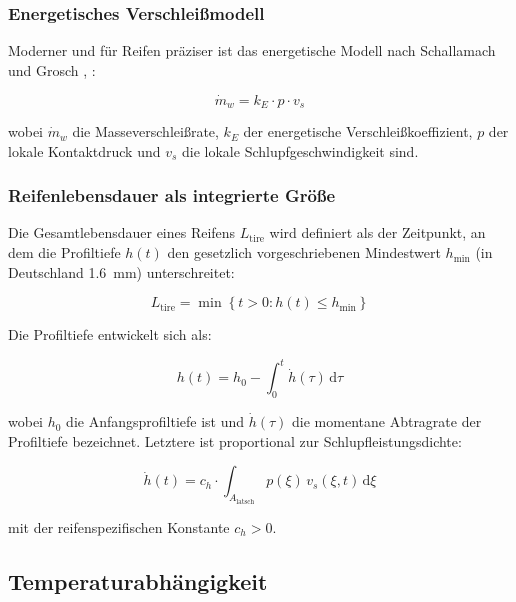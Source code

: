 ﻿\documentclass[12pt,a4paper]{article}
\theoremstyle{definition}
\theoremstyle{remark}
\newcommand{\Ltire}{L_{\mathrm{tire}}}
\begin{document}
\subsubsection{Energetisches Verschleißmodell}

Moderner und für Reifen präziser ist das energetische Modell nach
Schallamach und Grosch \cite{Schallamach1971}, \cite{Grosch1963}:

\begin{equation}
  \dot{m}_w = k_E \cdot p \cdot v_s
  \label{eq:energetisch}
\end{equation}

wobei $\dot{m}_w$ die Masseverschleißrate, $k_E$ der energetische
Verschleißkoeffizient, $p$ der lokale Kontaktdruck und $v_s$ die lokale
Schlupfgeschwindigkeit sind.

\subsubsection{Reifenlebensdauer als integrierte Größe}

Die Gesamtlebensdauer eines Reifens $\Ltire$ wird definiert als der
Zeitpunkt, an dem die Profiltiefe $h(t)$ den gesetzlich vorgeschriebenen
Mindest\-wert $h_{\min}$ (in Deutschland \SI{1,6}{\milli\metre}) unterschreitet:

\begin{equation}
  \Ltire = \min\!\left\{t > 0 : h(t) \leq h_{\min}\right\}
  \label{eq:life_def}
\end{equation}

Die Profiltiefe entwickelt sich als:

\begin{equation}
  h(t) = h_0 - \int_0^t \dot{h}(\tau)\,\mathrm{d}\tau
  \label{eq:profiltiefe}
\end{equation}

wobei $h_0$ die Anfangsprofiltiefe ist und $\dot{h}(\tau)$ die momentane
Abtragrate der Profiltiefe bezeichnet. Letztere ist proportional zur
Schlupfleistungsdichte:

\begin{equation}
  \dot{h}(t) = c_h \cdot \int_{A_{\mathrm{latsch}}} p(\xi)\,v_s(\xi,t)\,\mathrm{d}\xi
  \label{eq:hpunkt}
\end{equation}

mit der reifenspezifischen Konstante $c_h > 0$.

\subsection{Temperaturabhängigkeit}
\end{document}
